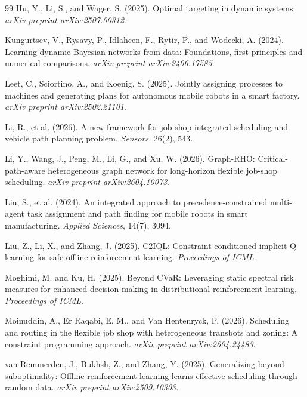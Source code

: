 \documentclass[11pt,a4paper]{article}
\begin{document}
\begin{thebibliography}{99}
Hu, Y., Li, S., and Wager, S. (2025).
Optimal targeting in dynamic systems.
\emph{arXiv preprint arXiv:2507.00312}.

Kungurtsev, V., Rysavy, P., Idlahcen, F., Rytir, P., and Wodecki, A. (2024).
Learning dynamic Bayesian networks from data: Foundations, first principles
and numerical comparisons.
\emph{arXiv preprint arXiv:2406.17585}.

Leet, C., Sciortino, A., and Koenig, S. (2025).
Jointly assigning processes to machines and generating plans for autonomous
mobile robots in a smart factory.
\emph{arXiv preprint arXiv:2502.21101}.

Li, R., et al. (2026).
A new framework for job shop integrated scheduling and vehicle path planning problem.
\emph{Sensors}, 26(2), 543.

Li, Y., Wang, J., Peng, M., Li, G., and Xu, W. (2026).
Graph-RHO: Critical-path-aware heterogeneous graph network for long-horizon
flexible job-shop scheduling.
\emph{arXiv preprint arXiv:2604.10073}.

Liu, S., et al. (2024).
An integrated approach to precedence-constrained multi-agent task assignment
and path finding for mobile robots in smart manufacturing.
\emph{Applied Sciences}, 14(7), 3094.

Liu, Z., Li, X., and Zhang, J. (2025).
C2IQL: Constraint-conditioned implicit Q-learning for safe offline
reinforcement learning.
\emph{Proceedings of ICML}.

Moghimi, M. and Ku, H. (2025).
Beyond CVaR: Leveraging static spectral risk measures for enhanced
decision-making in distributional reinforcement learning.
\emph{Proceedings of ICML}.

Moinuddin, A., Er Raqabi, E. M., and Van Hentenryck, P. (2026).
Scheduling and routing in the flexible job shop with heterogeneous transbots
and zoning: A constraint programming approach.
\emph{arXiv preprint arXiv:2604.24483}.

van Remmerden, J., Bukhsh, Z., and Zhang, Y. (2025).
Generalizing beyond suboptimality: Offline reinforcement learning learns
effective scheduling through random data.
\emph{arXiv preprint arXiv:2509.10303}.


\end{thebibliography}
\end{document}
